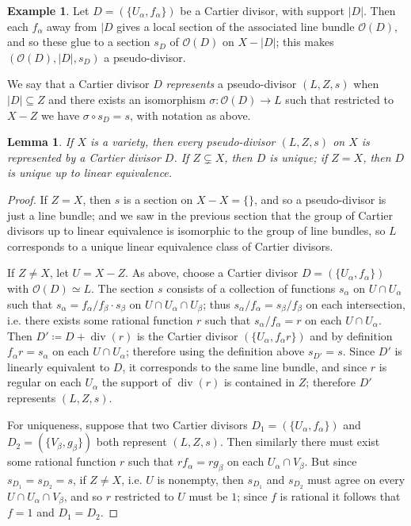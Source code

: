 \documentclass[leqno, openany]{memoir}
\newtheorem{lem}[thm]{Lemma}
\theoremstyle{definition}
\newtheorem{exm}[thm]{Example}
\theoremstyle{remark}
\theoremstyle{plain}
\theoremstyle{definition}
\theoremstyle{remark}
\newcommand{\mc}[1]{\mathcal{#1}}
\renewcommand{\div}{\operatorname{div}}
\begin{document}
\begin{exm} Let $D = (\{U_\alpha, f_\alpha\})$ be a Cartier divisor, with
    support $|D|$. Then each $f_\alpha$ away from $|D$ gives a local section of
    the associated line bundle $\mc{O}(D)$, and so these glue to a section
    $s_D$ of $\mc{O}(D)$ on $X-|D|$; this makes $(\mc{O}(D), |D|, s_D)$ a
    pseudo-divisor.

We say that a Cartier divisor $D$ \textit{represents} a pseudo-divisor
$(L,Z,s)$ when $|D| \subseteq Z$ and there exists an isomorphism $\sigma\colon
\mc{O}(D) \to L$ such that restricted to $X-Z$ we have $\sigma \circ s_D = s$,
with notation as above.  \end{exm}

\begin{lem} If $X$ is a variety, then every pseudo-divisor $(L,Z,s)$ on $X$ is
    represented by a Cartier divisor $D$. If $Z \subsetneq X$, then $D$ is
    unique; if $Z = X$, then $D$ is unique up to linear equivalence.  \end{lem}
    \begin{proof} If $Z = X$, then $s$ is a section on $X - X = \{\}$, and so a
        pseudo-divisor is just a line bundle; and we saw in the previous
        section that the group of Cartier divisors up to linear equivalence is
        isomorphic to the group of line bundles, so $L$ corresponds to a unique
        linear equivalence class of Cartier divisors.

If $Z \neq X$, let $U = X - Z$. As above, choose a Cartier divisor $D =
(\{U_\alpha, f_\alpha\})$ with $\mc{O}(D) \simeq L$. The section $s$ consists
of a collection of functions $s_\alpha$ on $U \cap U_\alpha$ such that
$s_\alpha = f_\alpha/f_\beta \cdot s_\beta$ on $U \cap U_\alpha \cap U_\beta$;
thus $s_\alpha/f_\alpha = s_\beta/f_\beta$ on each intersection, i.e. there
exists some rational function $r$ such that $s_\alpha / f_\alpha = r$ on each
$U \cap U_\alpha$. Then $D' \coloneqq D + \div(r)$ is the Cartier divisor
$(\{U_\alpha, f_\alpha r\})$ and by definition $f_\alpha r = s_\alpha$ on each
$U \cap U_\alpha$; therefore using the definition above $s_{D'} = s$. Since
$D'$ is linearly equivalent to $D$, it corresponds to the same line bundle, and
since $r$ is regular on each $U_\alpha$ the support of $\div(r)$ is contained
in $Z$; therefore $D'$ represents $(L,Z,s)$.

For uniqueness, suppose that two Cartier divisors $D_1 = (\{U_\alpha,
f_\alpha\})$ and $D_2 = (\{V_\beta, g_\beta\})$ both represent $(L,Z,s)$. Then
similarly there must exist some rational function $r$ such that $r f_\alpha = r
g_\beta$ on each $U_\alpha \cap V_\beta$. But since $s_{D_1} = s_{D_2} = s$, if
$Z \neq X$, i.e. $U$ is nonempty, then $s_{D_1}$ and $s_{D_2}$ must agree on
every $U \cap U_\alpha \cap V_\beta$, and so $r$ restricted to $U$ must be $1$;
since $f$ is rational it follows that $f = 1$ and $D_1 = D_2$.  \end{proof}
\end{document}
